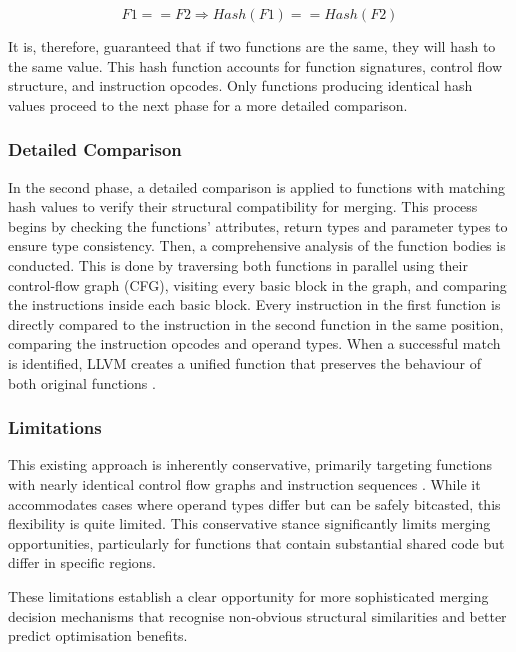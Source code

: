 \begin{equation}
F1 == F2 \Rightarrow Hash(F1) == Hash(F2)
\end{equation}

It is, therefore, guaranteed that if two functions are the same, they will hash to the same value. This hash function accounts for function signatures, control flow structure, and instruction opcodes. Only functions producing identical hash values proceed to the next phase for a more detailed comparison.

\subsubsection{Detailed Comparison}
In the second phase, a detailed comparison is applied to functions with matching hash values to verify their structural compatibility for merging. This process begins by checking the functions' attributes, return types and parameter types to ensure type consistency. Then, a comprehensive analysis of the function bodies is conducted. This is done by traversing both functions in parallel using their control-flow graph (CFG), visiting every basic block in the graph, and comparing the instructions inside each basic block. Every instruction in the first function is directly compared to the instruction in the second function in the same position, comparing the instruction opcodes and operand types. When a successful match is identified, LLVM creates a unified function that preserves the behaviour of both original functions \cite{LLVMFuncMergSrc}.

\subsubsection{Limitations}
This existing approach is inherently conservative, primarily targeting functions with nearly identical control flow graphs and instruction sequences \cite{LLVMMergeFunctionsPass}. While it accommodates cases where operand types differ but can be safely bitcasted, this flexibility is quite limited. This conservative stance significantly limits merging opportunities, particularly for functions that contain substantial shared code but differ in specific regions. 

These limitations establish a clear opportunity for more sophisticated merging decision mechanisms that recognise non-obvious structural similarities and better predict optimisation benefits.


